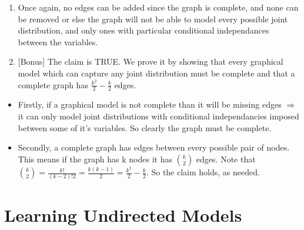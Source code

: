 \documentclass[]{article}
\begin{document}

\begin{enumerate}
\def\labelenumi{\arabic{enumi}.}
\setcounter{enumi}{3}
\item
  Once again, no edges can be added since the graph is complete, and
  none can be removed or else the graph will not be able to model every
  possible joint distribution, and only ones with particular conditional
  independances between the variables.
\item
  {[}Bonus{]} The claim is TRUE. We prove it by showing that every
  graphical model which can capture any joint distribution must be
  complete and that a complete graph has \(\frac{k^2}{2} - \frac{k}{2}\)
  edges.
\end{enumerate}

\begin{itemize}
\item
  Firstly, if a graphical model is not complete than it will be missing
  edges \(\Rightarrow\) it can only model joint distributions with
  conditional independancies imposed between some of it's variables. So
  clearly the graph must be complete.
\item
  Secondly, a complete graph has edges between every possible pair of
  nodes. This means if the graph has k nodes it has \({k \choose 2}\)
  edges. Note that
  \({k \choose 2} = \frac{k!}{(k-2)!2} = \frac{k(k-1)}{2} = \frac{k^2}{2} - \frac{k}{2}\).
  So the claim holds, as needed.
\end{itemize}

\section{Learning Undirected Models}\label{learning-undirected-models}
\end{document}
